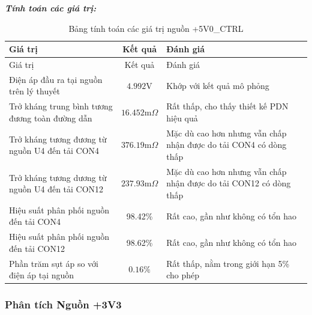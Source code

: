             \textbf{\textit{Tính toán các giá trị:}}
            \begin{longtable}{|p{}|c|p{}|}           
                \caption{Bảng tính toán các giá trị nguồn +5V0\_CTRL}\\
                \hline
                Giá trị & Kết quả & Đánh giá \\
                \hline
                \endfirsthead
                
                \hline
                Giá trị & Kết quả & Đánh giá \\
                \hline
                \endhead
                
                \hline
                \endfoot
                
                \hline
                \endlastfoot
                
                Điện áp đầu ra tại nguồn trên lý thuyết & $4.992\text{V}$ & Khớp với kết quả mô phỏng \\
                Trở kháng trung bình tương đương toàn đường dẫn & $16.452 \text{m}\Omega$ & Rất thấp, cho thấy thiết kế PDN hiệu quả \\
                Trở kháng tương đương từ nguồn U4 đến tải CON4 & $376.19 \text{m}\Omega$ & Mặc dù cao hơn nhưng vẫn chấp nhận được do tải CON4 có dòng thấp \\
                Trở kháng tương dương từ nguồn U4 đến tải CON12 & $237.93 \text{m}\Omega$ & Mặc dù cao hơn nhưng vẫn chấp nhận được do tải CON12 có dòng thấp \\
                Hiệu suất phân phối nguồn đến tải CON4 & 98.42\% & Rất cao, gần như không có tổn hao \\
                Hiệu suất phân phối nguồn đến tải CON12 & 98.62\% & Rất cao, gần như không có tổn hao \\
                Phần trăm sụt áp so với điện áp tại nguồn & $\mathbf{0.16\%}$ & Rất thấp, nằm trong giới hạn 5\% cho phép
                \label{tab:5v0_ctrl_current_density_calculation}\\

                \hline
            \end{longtable}
            
        \subsubsection{Phân tích Nguồn +3V3}
                
